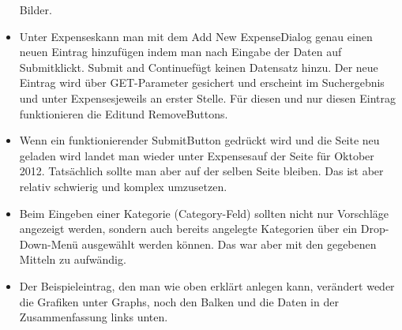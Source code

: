 \documentclass[a4paper,10pt]{article}
\begin{document}
\begin{itemize}
            Bilder.
    \item Unter \glqq Expenses\grqq\space kann man mit dem \glqq Add New
            Expense\grqq\space Dialog genau einen neuen Eintrag hinzuf\"ugen indem
            man nach Eingabe der Daten auf \glqq Submit\grqq\space klickt. \glqq
            Submit and Continue\grqq\space f\"ugt keinen Datensatz hinzu. Der neue
            Eintrag wird \"uber GET-Parameter gesichert und erscheint im Suchergebnis
            und unter \glqq Expenses\grqq\space jeweils an erster Stelle. F\"ur
            diesen und nur diesen Eintrag funktionieren die \glqq Edit\grqq\space und
            \glqq Remove\grqq\space Buttons.
    \item Wenn ein funktionierender \glqq Submit\grqq\space Button gedr\"uckt wird
            und die Seite neu geladen wird landet man wieder unter \glqq
            Expenses\grqq\space auf der Seite f\"ur Oktober 2012. Tats\"achlich
            sollte man aber auf der selben Seite bleiben. Das ist aber relativ
            schwierig und komplex umzusetzen.
    \item Beim Eingeben einer Kategorie (\glqq Category\grqq-Feld) sollten nicht nur
            Vorschl\"age angezeigt werden, sondern auch bereits angelegte Kategorien
            \"uber ein Drop-Down-Men\"u ausgew\"ahlt werden k\"onnen. Das war aber
            mit den gegebenen Mitteln zu aufw\"andig.
    \item Der Beispieleintrag, den man wie oben erkl\"art anlegen kann, ver\"andert
            weder die Grafiken unter \glqq Graphs\grqq, noch den Balken und die Daten
            in der Zusammenfassung links unten.
\end{itemize}
\end{document}
